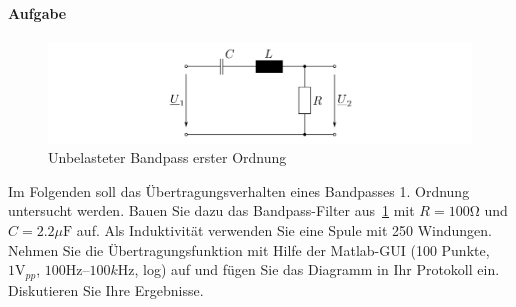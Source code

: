 \documentclass[10pt]{scrreprt}
\begin{document}
    \paragraph{Aufgabe}
    \begin{center}
        \begin{figure}[H]
            \includegraphics[width=\textwidth]{abb17.png}
            \caption{Unbelasteter Bandpass erster Ordnung}
            \label{fig:abb17}
        \end{figure}
    \end{center}
    Im Folgenden soll das Übertragungsverhalten eines Bandpasses 1. Ordnung untersucht
    werden. Bauen Sie dazu das Bandpass-Filter aus~\ref{fig:abb17} mit $R = 100 \si{\ohm}$ und $C = 2.2 \si{\mu\farad}$
    auf. Als Induktivität verwenden Sie eine Spule mit 250 Windungen.
    Nehmen Sie die Übertragungsfunktion mit Hilfe der Matlab-GUI (100 Punkte, $1\si{\volt}_{pp}$,
    $100\si{\hertz}$–$100\si{k\hertz}$, log) auf und fügen Sie das Diagramm in Ihr Protokoll ein. Diskutieren
    Sie Ihre Ergebnisse.
\end{document}

